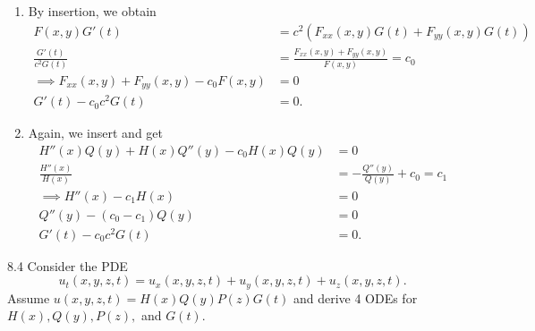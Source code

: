 \begin{derivation}
  \begin{enumerate}[label=\alph*)]
    \item By insertion, we obtain
      \begin{align*}
        F(x,y) G'(t) &= c^2 \left( F_{x x}(x,y)G(t) + F_{yy}(x,y)G(t) \right) \\
        \frac{G'(t)}{c^2 G(t)} &= \frac{F_{x x}(x,y) + F_{yy}(x,y)}{F(x,y)} = c_0 \\
        \implies F_{x x}(x,y) + F_{yy}(x,y) - c_0 F(x,y) &= 0 \\
        G'(t) - c_0 c^2 G(t) &= 0
      .\end{align*}
    \item Again, we insert and get
      \begin{align*}
        H''(x) Q(y) + H(x) Q''(y) - c_0 H(x) Q(y) &= 0 \\
        \frac{H''(x)}{H(x)} &= -\frac{Q''(y)}{Q(y)} + c_0 = c_1 \\
        \implies H''(x) - c_1 H(x) &= 0 \\
        Q''(y) - (c_0 - c_1) Q(y) &= 0 \\
        G'(t) - c_0 c^2 G(t) &= 0
      .\end{align*}
  \end{enumerate}
\end{derivation}


\begin{problem}{8.4}
  Consider the PDE
  \[ 
  u_t(x,y,z,t) = u_x(x,y,z,t) + u_y(x,y,z,t) + u_z(x,y,z,t)
  .\]
  Assume $u(x,y,z,t) = H(x)Q(y)P(z)G(t)$ and derive 4 ODEs for $H(x), Q(y), P(z),$ and $G(t)$.
\end{problem}

